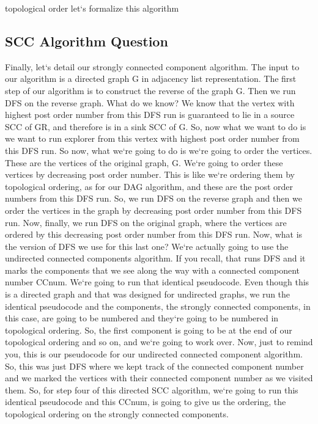 topological order let`s formalize this algorithm

\subsection{SCC Algorithm Question}
Finally, let`s detail our strongly connected component algorithm.
The input to our algorithm is a directed graph G in adjacency list representation.
The first step of our algorithm is to construct the reverse of the graph G\@.
Then we run DFS on the reverse graph.
What do we know? We know that the vertex with highest post order number from this DFS run is guaranteed to lie in a source SCC of GR, and therefore is in a sink SCC of G\@.
So, now what we want to do is we want to run explorer from this vertex with highest post order number from this DFS run.
So now, what we`re going to do is we`re going to order the vertices.
These are the vertices of the original graph, G\@.
We`re going to order these vertices by decreasing post order number.
This is like we`re ordering them by topological ordering, as for our DAG algorithm, and these are the post order numbers from this DFS run.
So, we run DFS on the reverse graph and then we order the vertices in the graph by decreasing post order number from this DFS run.
Now, finally, we run DFS on the original graph, where the vertices are ordered by this decreasing post order number from this DFS run.
Now, what is the version of DFS we use for this last one? We`re actually going to use the undirected connected components algorithm.
If you recall, that runs DFS and it marks the components that we see along the way with a connected component number CCnum.
We`re going to run that identical pseudocode.
Even though this is a directed graph and that was designed for undirected graphs, we run the identical pseudocode and the components, the strongly connected components, in this case, are going to be numbered and they`re going to be numbered in topological ordering.
So, the first component is going to be at the end of our topological ordering and so on, and we`re going to work over.
Now, just to remind you, this is our pseudocode for our undirected connected component algorithm.
So, this was just DFS where we kept track of the connected component number and we marked the vertices with their connected component number as we visited them.
So, for step four of this directed SCC algorithm, we`re going to run this identical pseudocode and this CCnum, is going to give us the ordering, the topological ordering on the strongly connected components.

